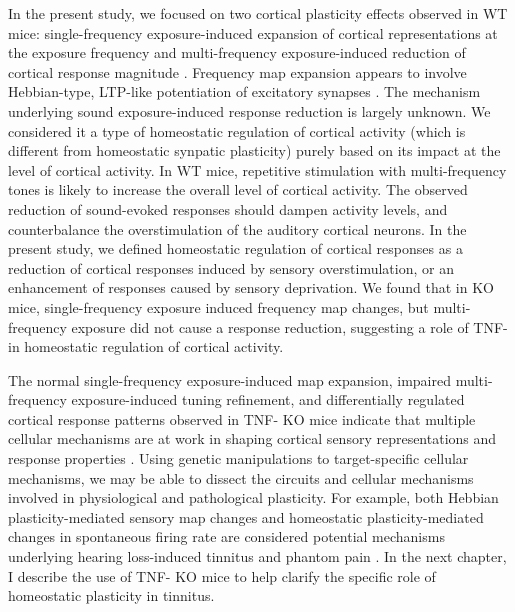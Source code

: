 In the present study, we focused on two cortical plasticity effects observed in WT mice: single-frequency exposure-induced expansion of cortical representations at the exposure frequency and multi-frequency exposure-induced reduction of cortical response magnitude \cite{Condon1991, Zhang2001, Pienkowski2012}. Frequency map expansion appears to involve Hebbian-type, LTP-like potentiation of excitatory synapses \cite{Froemke2007, Sun2010}. The mechanism underlying sound exposure-induced response reduction is largely unknown. We considered it a type of homeostatic regulation of cortical activity (which is different from homeostatic synpatic plasticity) purely based on its impact at the level of cortical activity. In WT mice, repetitive stimulation with multi-frequency tones is likely to increase the overall level of cortical activity. The observed reduction of sound-evoked responses should dampen activity levels, and counterbalance the overstimulation of the auditory cortical neurons. In the present study, we defined homeostatic regulation of cortical responses as a reduction of cortical responses induced by sensory overstimulation, or an enhancement of responses caused by sensory deprivation. We found that in KO mice, single-frequency exposure induced frequency map changes, but multi-frequency exposure did not cause a response reduction, suggesting a role of TNF-\textalpha{} in homeostatic regulation of cortical activity.

The normal single-frequency exposure-induced map expansion, impaired multi-frequency exposure-induced tuning refinement, and differentially regulated cortical response patterns observed in TNF-\textalpha{} KO mice indicate that multiple cellular mechanisms are at work in shaping cortical sensory representations and response properties \cite{Bear2003, Bear2003, Burrone2003, Turrigiano2004, Dan2006, Liu2007, Wu2008, Feldman2009}. Using genetic manipulations to target-specific cellular mechanisms, we may be able to dissect the circuits and cellular mechanisms involved in physiological and pathological plasticity. For example, both Hebbian plasticity-mediated sensory map changes and homeostatic plasticity-mediated changes in spontaneous firing rate are considered potential mechanisms underlying hearing loss-induced tinnitus and phantom pain \cite{Eggermont2006, Yang2011a}. In the next chapter, I describe the use of TNF-\textalpha{} KO mice to help clarify the specific role of homeostatic plasticity in tinnitus.

\printbibliography